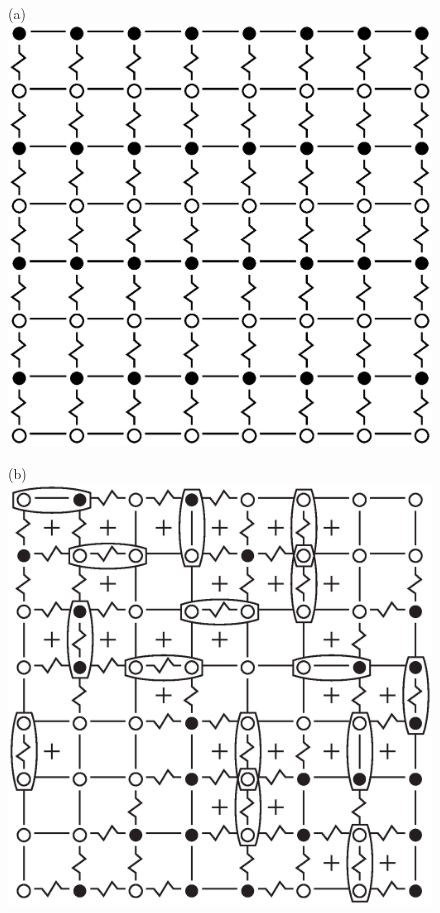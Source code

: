 \documentclass[utf8, babel, sor, jor, amsmath, amssymb, reprint]{elsarticle} %
\begin{document}
\begin{figure}[H]
	\begin{minipage}[h]{0.3\linewidth}
		\centering(a)
		\includegraphics[width=1\linewidth]{pictures/SI_64_J0_1}
	\end{minipage}
	\hfill
	\begin{minipage}[h]{0.3\linewidth}
	\centering(b)
	\includegraphics[width=1\linewidth]{pictures/SG_64_J0}

\end{minipage}
\end{figure}
\end{document}
